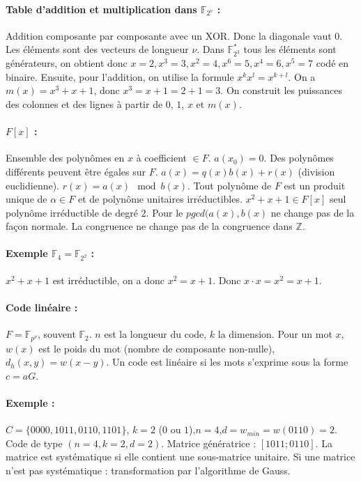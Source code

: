 \documentclass[11pt,a4paper]{report}
\newcommand{\z}{\mathbb{Z}}
\newcommand{\f}{\mathbb{F}}
\begin{document}
\paragraph*{Table d'addition et multiplication dans $\f_{2^\nu}$ :} Addition composante par composante avec un XOR. Donc la diagonale vaut $0$. Les éléments sont des vecteurs de longueur $\nu$. Dans $\f_{2^3}^*$ tous les éléments sont générateurs, on obtient donc $x=2,x^3=3,x^2=4,x^6=5,x^4=6,x^5=7$ codé en binaire. Ensuite, pour l'addition, on utilise la formule $x^kx^l=x^{k+l}$. On a $m(x)=x^3+x+1$, donc $x^3=x+1=2+1=3$. On construit les puissances des colonnes et des lignes à partir de $0$, $1$, $x$ et $m(x)$.

\paragraph*{$F[x]$ :} Ensemble des polynômes en $x$ à coefficient $\in F$. $a(x_0)=0$. Des polynômes différents peuvent être égales sur $F$. $a(x) = q(x)b(x)+r(x)$ (division euclidienne). $r(x) = a(x) \mod b(x)$. Tout polynôme de $F$ est un produit unique de $\alpha\in F$ et de polynôme unitaires irréductibles. $x^2+x+1\in F[x]$ seul polynôme irréductible de degré $2$. Pour le $pgcd(a(x),b(x)$ ne change pas de la façon normale. La congruence ne change pas de la congruence dans $\z$.

\paragraph*{Exemple $\mathbb{F}_4 = \mathbb{F}_{2^2}$ :} $x^2+x+1$ est irréductible, on a donc $x^2=x+1$. Donc $x\cdot x = x^2 = x+1$.

\paragraph*{Code linéaire :} $F=\mathbb{F}_{p^\nu}$, souvent $\mathbb{F}_2$. $n$ est la longueur du code, $k$ la dimension. Pour un mot $x$, $w(x)$ est le poids du mot (nombre de composante non-nulle), $d_h(x,y) = w(x-y)$. Un code est linéaire si les mots s'exprime sous la forme $c=aG$.

\paragraph*{Exemple :} $C=\{0000,1011,0110,1101\}$, $k=2$ ($0$ ou $1$),$n=4$,$d=w_{min}=w(0110)=2$. Code de type $(n=4,k=2,d=2)$. Matrice génératrice : $[1011;0110]$. La matrice est systématique si elle contient une sous-matrice unitaire. Si une matrice n'est pas systématique : transformation par l'algorithme de Gauss.
\end{document}
